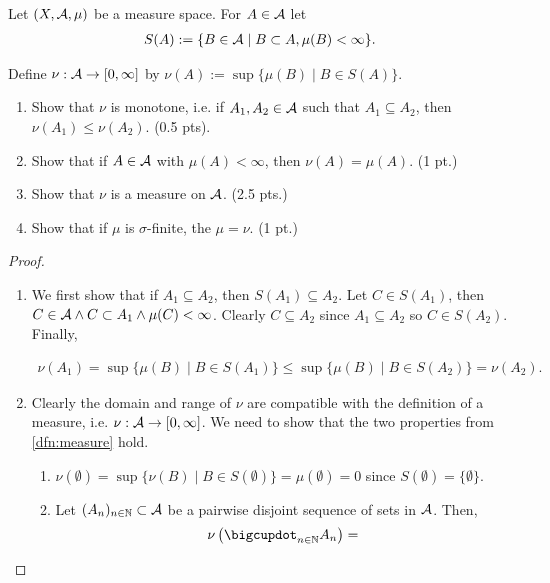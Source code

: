 \begin{ex}
	Let $(X, \mathcal{A}, \mu)$ be a measure space. For $A \in \mathcal{A}$ let
	\begin{align*}
		S(A) := \{B \in \mathcal{A} \mid B \subset A, \mu(B) < \infty\}.
	\end{align*}
	
	Define $\nu: \mathcal{A} \to [0, \infty]$ by $\nu(A) := \sup\{ \mu(B) \mid B \in S(A)\}$.
	
	\begin{enumerate}
		\item Show that $\nu$ is monotone, i.e. if $A_1, A_2 \in \mathcal{A}$ such that $A_1 \subseteq A_2$, then $\nu(A_1) \leq \nu(A_2)$. (0.5 pts).
		\item Show that if $A \in \mathcal{A}$ with $\mu(A) < \infty$, then $\nu(A) = \mu(A)$. (1 pt.)
		\item Show that $\nu$ is a measure on $\mathcal{A}$. (2.5 pts.)
		\item Show that if $\mu$ is $\sigma$-finite, the $\mu = \nu$. (1 pt.)
	\end{enumerate}
\end{ex}

\begin{proof}
	$ $\newline
	\begin{enumerate}
		\item We first show that if $A_1 \subseteq A_2$, then $S(A_1) \subseteq A_2$. Let $C \in S(A_1)$, then $C \in \mathcal{A} \land C \subset A_1 \land \mu(C) < \infty$. Clearly $C \subseteq A_2$ since $A_1 \subseteq A_2$ so $C \in S(A_2)$. Finally,
		
		\begin{align*}
			\nu(A_1) = \sup \{\mu(B) \mid B \in S(A_1)\} \leq \sup \{\mu(B) \mid B \in S(A_2)\} = \nu(A_2).
		\end{align*}
		
		\item Clearly the domain and range of $\nu$ are compatible with the definition of a measure, i.e. $\nu: \mathcal{A} \to [0, \infty]$. We need to show that the two properties from \autoref{dfn:measure} hold.
		\begin{enumerate}
			\item $\nu(\emptyset) = \sup \{\nu(B) \mid B \in S(\emptyset)\} = \mu(\emptyset) = 0$ since $S(\emptyset) = \{ \emptyset\}$.
			\item Let $(A_n)_{n\in\mathbb{N}} \subset \mathcal{A}$ be a pairwise disjoint sequence of sets in $\mathcal{A}$. Then,
			\begin{align*}
				\nu\left(\bigcupdot_{n \in \N} A_n\right) = 
			\end{align*}
		\end{enumerate}
	\end{enumerate}
\end{proof}


